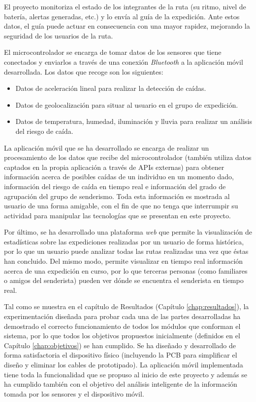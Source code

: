 El proyecto monitoriza el estado de los integrantes de la ruta (su ritmo, nivel de batería, alertas generadas, etc.) y lo envía al guía de la expedición. Ante estos datos, el guía puede actuar en consecuencia con una mayor rapidez, mejorando la seguridad de los usuarios de la ruta.

El microcontrolador se encarga de tomar datos de los sensores que tiene conectados y enviarlos a través de una conexión \textit{Bluetooth} a la aplicación móvil desarrollada. Los datos que recoge son los siguientes: 

\begin{itemize}
\item Datos de aceleración lineal para realizar la detección de caídas.
\item Datos de geolocalización para situar al usuario en el grupo de expedición.
\item Datos de temperatura, humedad, iluminación y lluvia para realizar un análisis del riesgo de caída.
\end{itemize}

La aplicación móvil que se ha desarrollado se encarga de realizar un procesamiento de los datos que recibe del microcontrolador (también utiliza datos captados en la propia aplicación a través de \ac{API}s externas) para obtener información acerca de posibles caídas de un individuo en un momento dado, información del riesgo de caída en tiempo real e información del grado de agrupación del grupo de senderismo. Toda esta información es mostrada al usuario de una forma amigable, con el fin de que no tenga que interrumpir su actividad para manipular las tecnologías que se presentan en este proyecto.

Por último, se ha desarrollado una plataforma \textit{web} que permite la visualización de estadísticas sobre las expediciones realizadas por un usuario de forma histórica, por lo que un usuario puede analizar todas las rutas realizadas una vez que éstas han concluido. Del mismo modo, permite visualizar en tiempo real información acerca de una expedición en curso, por lo que terceras personas (como familiares o amigos del senderista) pueden ver dónde se encuentra el senderista en tiempo real.

Tal como se muestra en el capítulo de Resultados (Capítulo \ref{chap:resultados}), la experimentación diseñada para probar cada una de las partes desarrolladas ha demostrado el correcto funcionamiento de todos los módulos que conforman el sistema, por lo que todos los objetivos propuestos inicialmente (definidos en el Capítulo \ref{chap:objetivos}) se han cumplido. Se ha diseñado y desarrollado de forma satisfactoria el dispositivo físico (incluyendo la \ac{PCB} para simplificar el diseño y eliminar los cables de prototipado). La aplicación móvil implementada tiene toda la funcionalidad que se propuso al inicio de este proyecto y además se ha cumplido también con el objetivo del análisis inteligente de la información tomada por los sensores y el dispositivo móvil.


